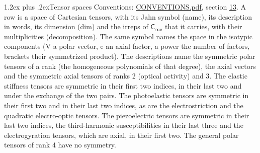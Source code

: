 \documentclass[10pt,a4paper]{article}
\makeatletter
\renewcommand\section{\@startsection{section}{1}{\z@}{-3ex plus -1ex minus -.2ex}%
  {1.2ex plus .2ex}{\normalfont\large\sffamily\bfseries\color{parttitle}}}
\numberwithin{equation}{section}
\newcommand{\grp}[1]{\mathsf{#1}}
\makeatother
\begin{document}
\section{Tensor spaces}\label{s:tensor_spaces}
Conventions: \href{../../CONVENTIONS.pdf}{CONVENTIONS.pdf}, section \href{../../CONVENTIONS.pdf\#conv.13}{13}.
\leavevmode\label{n:head.name}\label{n:head.description}\label{n:head.dim}\label{n:head.decomposition}A row is a space of Cartesian tensors, with its Jahn symbol (name), its description in words, its dimension (dim) and the irreps of $\grp{C_{\infty v}}$ that it carries, with their multiplicities (decomposition). \label{n:label.jahn}The same symbol names the space in the isotypic components (V a polar vector, e an axial factor, a power the number of factors, brackets their symmetrized product). The descriptions name the symmetric polar tensors of a rank (the homogeneous polynomials of that degree), the axial vectors and the symmetric axial tensors of ranks 2 (optical activity) and 3. The elastic stiffness tensors are symmetric in their first two indices, in their last two and under the exchange of the two pairs. The photoelastic tensors are symmetric in their first two and in their last two indices, as are the electrostriction and the quadratic electro-optic tensors. The piezoelectric tensors are symmetric in their last two indices, the third-harmonic susceptibilities in their last three and the electrogyration tensors, which are axial, in their first two. The general polar tensors of rank 4 have no symmetry.
\end{document}

